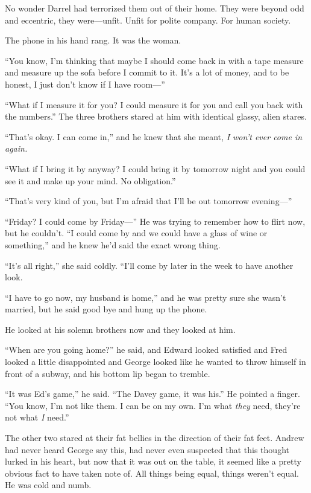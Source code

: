 No wonder Darrel had terrorized them out of their home.  They were
beyond odd and eccentric, they were---unfit.  Unfit for polite
company.  For human society.

The phone in his hand rang.  It was the woman.

``You know, I'm thinking that maybe I should come back in with a tape
measure and measure up the sofa before I commit to it.  It's a lot of
money, and to be honest, I just don't know if I have room---''

``What if I measure it for you?  I could measure it for you and call
you back with the numbers.'' The three brothers stared at him with
identical glassy, alien stares.

``That's okay.  I can come in,'' and he knew that she meant, \textit{I
won't ever come in again.}

``What if I bring it by anyway?  I could bring it by tomorrow night
and you could see it and make up your mind.  No obligation.''

``That's very kind of you, but I'm afraid that I'll be out tomorrow
evening---''

``Friday?  I could come by Friday---'' He was trying to remember how
to flirt now, but he couldn't.  ``I could come by and we could have a
glass of wine or something,'' and he knew he'd said the exact wrong
thing.

``It's all right,'' she said coldly.  ``I'll come by later in the week
to have another look.

``I have to go now, my husband is home,'' and he was pretty sure she
wasn't married, but he said good bye and hung up the phone.

He looked at his solemn brothers now and they looked at him.

``When are you going home?'' he said, and Edward looked satisfied and
Fred looked a little disappointed and George looked like he wanted to
throw himself in front of a subway, and his bottom lip began to
tremble.

``It was Ed's game,'' he said.  ``The Davey game, it was his.'' He
pointed a finger.  ``You know, I'm not like them.  I can be on my own. 
I'm what \textit{they} need, they're not what \textit{I} need.''

The other two stared at their fat bellies in the direction of their
fat feet.  Andrew had never heard George say this, had never even
suspected that this thought lurked in his heart, but now that it was
out on the table, it seemed like a pretty obvious fact to have taken
note of.  All things being equal, things weren't equal.  He was cold
and numb.

